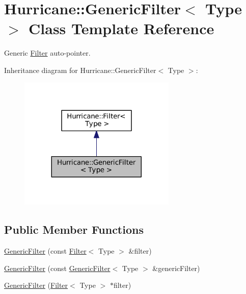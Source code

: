 \hypertarget{classHurricane_1_1GenericFilter}{}\section{Hurricane\+:\+:Generic\+Filter$<$ Type $>$ Class Template Reference}
\label{classHurricane_1_1GenericFilter}


Generic \mbox{\hyperlink{classHurricane_1_1Filter}{Filter}} auto-\/pointer.  




Inheritance diagram for Hurricane\+:\+:Generic\+Filter$<$ Type $>$\+:\nopagebreak
\begin{figure}[H]
\begin{center}
\leavevmode
\includegraphics[width=212pt]{classHurricane_1_1GenericFilter__inherit__graph}
\end{center}
\end{figure}
\subsection*{Public Member Functions}
\begin{DoxyCompactItemize}
\item 
\mbox{\hyperlink{classHurricane_1_1GenericFilter_a1aae208fe9937dd3a6f706ceb8b3b9b4}{Generic\+Filter}} (const \mbox{\hyperlink{classHurricane_1_1Filter}{Filter}}$<$ Type $>$ \&filter)
\item 
\mbox{\hyperlink{classHurricane_1_1GenericFilter_adf44866e7507f45dd0d612743f2d9a71}{Generic\+Filter}} (const \mbox{\hyperlink{classHurricane_1_1GenericFilter}{Generic\+Filter}}$<$ Type $>$ \&generic\+Filter)
\item 
\mbox{\hyperlink{classHurricane_1_1GenericFilter_aac847f0c0d6ee640c54847e374287fe1}{Generic\+Filter}} (\mbox{\hyperlink{classHurricane_1_1Filter}{Filter}}$<$ Type $>$ $\ast$filter)
\end{DoxyCompactItemize}


